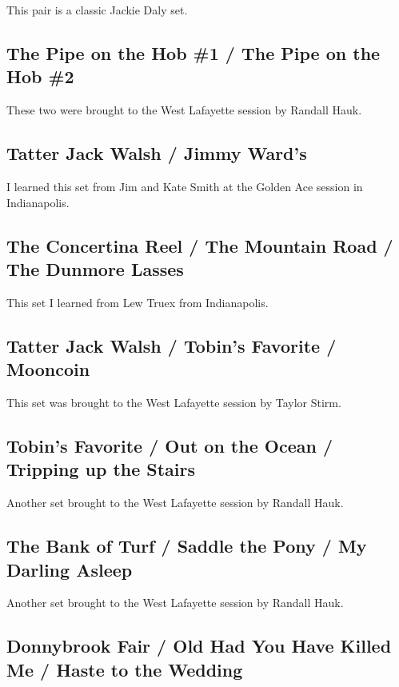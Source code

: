 \documentclass[9pt,letterpaper]{article}
\begin{document}
{This pair is a classic Jackie Daly set.

\subsection{The Pipe on the Hob \#1 / The Pipe on the Hob \#2}

These two were brought to the West Lafayette session by Randall Hauk.

\subsection{Tatter Jack Walsh / Jimmy Ward's}

I learned this set from Jim and Kate Smith at the Golden Ace session in Indianapolis.

\subsection{The Concertina Reel / The Mountain Road / The Dunmore Lasses}

This set I learned from Lew Truex from Indianapolis.

\subsection{Tatter Jack Walsh / Tobin's Favorite / Mooncoin}

This set was brought to the West Lafayette session by Taylor Stirm.

\subsection{Tobin's Favorite / Out on the Ocean / Tripping up the Stairs}

Another set brought to the West Lafayette session by Randall Hauk.

\subsection{The Bank of Turf / Saddle the Pony / My Darling Asleep}

Another set brought to the West Lafayette session by Randall Hauk.

\subsection{Donnybrook Fair / Old Had You Have Killed Me / Haste to the Wedding}

}
\end{document}
